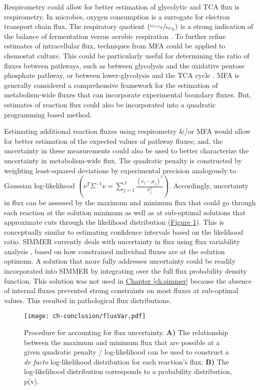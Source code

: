 Respirometry could allow for better estimation of glycolytic and TCA flux is respirometry.  In microbes, oxygen consumption is a surrogate for electron transport chain flux. The respiratory quotient $\left(\sfrac{\nu_{CO_{2}}}{\nu_{O_{2}}}\right)$ is a strong indication of the balance of fermentation versus aerobic respiration \cite{Boer:2003fi,BARFORD:1979ei}. To further refine estimates of intracellular flux, techniques from MFA could be applied to chemostat culture. This could be particularly useful for determining the ratio of fluxes between pathways, such as between glycolysis and the oxidative pentose phosphate pathway, or between lower-glycolysis and the TCA cycle \cite{Sauer:2006ii, Jazmin:2013fg, Kromer:2014wr}. MFA is generally considered a comprehensive framework for the estimation of metabolism-wide fluxes that can incorporate experimental boundary fluxes. But, estimates of reaction flux could also be incorporated into a quadratic programming based method.

Estimating additional reaction fluxes using respirometry \&/or MFA would allow for better estimation of the expected values of pathway fluxes; and, the uncertainty in these measurements could also be used to better characterize the uncertainty in metabolism-wide flux. The quadratic penalty is constructed by weighting least-squared deviations by experimental precision analogously to Gaussian log-likelihood $\left(\nu^{T}\Sigma^{-1}\nu = \sum_{j = 1}^{J}\frac{\left(x_{j} - \mu_{j}\right)^2}{\sigma^{2}_j}\right)$. Accordingly, uncertainty in flux can be assessed by the maximum and minimum flux that could go through each reaction at the solution minimum as well as at sub-optimal solutions that approximate cuts through the likelihood distribution (\hyperref[conclusion-fluxUncertainty]{Figure \ref{conclusion-fluxUncertainty}}). This is conceptually similar to estimating confidence intervals based on the likelihood ratio. SIMMER currently deals with uncertainty in flux using flux variability analysis \cite{Mahadevan:2003wq}, based on how constrained individual fluxes are at the solution optimum. A solution that more fully addresses uncertainty could be readily incorporated into SIMMER by integrating over the full flux probability density function.  This solution was not used in \hyperref[ch:simmer]{Chapter \ref{ch:simmer}} because the absence of internal fluxes prevented strong constraints on most fluxes at sub-optimal values. This resulted in pathological flux distributions. 

\begin{figure}[h!]
\begin{center}
\texttt{[image: ch-conclusion/fluxVar.pdf]}
\caption[Procedure for accounting for flux uncertainty]{Procedure for accounting for flux uncertainty. \textbf{A)} The relationship between the maximum and minimum flux that are possible at a given quadratic penalty / log-likelihood can be used to construct a \textit{de facto} log-likelihood distribution for each reaction's flux. \textbf{B)} The log-likelihood distribution corresponds to a probability distribution, p(v).}
\label{conclusion-fluxUncertainty}
\end{center}
\end{figure}



